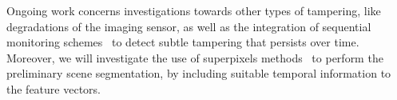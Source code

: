 \documentclass{llncs}
\begin{document}
Ongoing work concerns investigations towards other types of tampering, like degradations of the imaging sensor, as well as the integration of sequential monitoring schemes~\cite{alippi2010detecting} to detect subtle tampering that persists over time. Moreover, we will investigate the use of superpixels methods~\cite{Susstrunk2012} to perform the preliminary scene segmentation, by including suitable temporal information to the feature vectors.








%	
%	
\end{document}
